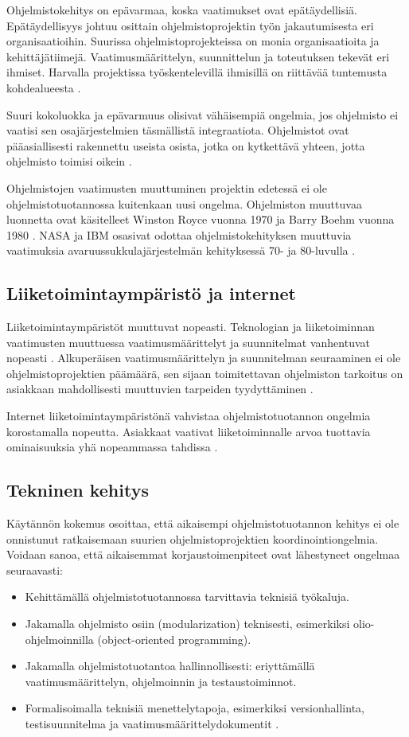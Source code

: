 \documentclass[finnish]{tktltiki2}
\theoremstyle{definition}
\theoremstyle{remark}
\begin{document}
Ohjelmistokehitys on epävarmaa, koska vaatimukset ovat epätäydellisiä. Epätäydellisyys johtuu osittain ohjelmistoprojektin työn jakautumisesta eri organisaatioihin.
Suurissa ohjelmistoprojekteissa on monia organisaatioita ja kehittäjätiimejä. Vaatimusmäärittelyn, suunnittelun ja toteutuksen tekevät eri ihmiset. Harvalla projektissa työskentelevillä ihmisillä on riittävää tuntemusta kohdealueesta \cite{KES95}.

Suuri kokoluokka ja epävarmuus olisivat vähäisempiä ongelmia, jos ohjelmisto ei vaatisi sen osajärjestelmien täsmällistä integraatiota. Ohjelmistot ovat pääasiallisesti rakennettu useista osista, jotka on kytkettävä yhteen, jotta ohjelmisto toimisi oikein \cite{KES95}.

Ohjelmistojen vaatimusten muuttuminen projektin edetessä ei ole ohjelmistotuotannossa kuitenkaan uusi ongelma. Ohjelmiston muuttuvaa luonnetta ovat käsitelleet Winston Royce vuonna 1970 \cite{ROY70} ja Barry Boehm vuonna 1980 \cite{BOE88}. NASA ja IBM osasivat odottaa ohjelmistokehityksen muuttuvia vaatimuksia avaruussukkulajärjestelmän kehityksessä 70- ja 80-luvulla \cite{MWR84}.

\subsection{Liiketoimintaympäristö ja internet}

Liiketoimintaympäristöt muuttuvat nopeasti. Teknologian ja liiketoiminnan vaatimusten muuttuessa vaatimusmäärittelyt ja suunnitelmat vanhentuvat nopeasti \cite{WIC03}. Alkuperäisen vaatimusmäärittelyn ja suunnitelman seuraaminen ei ole ohjelmistoprojektien päämäärä, sen sijaan toimitettavan ohjelmiston tarkoitus on asiakkaan mahdollisesti muuttuvien tarpeiden tyydyttäminen \cite{HIC01}.

Internet liiketoimintaympäristönä vahvistaa ohjelmistotuotannon ongelmia korostamalla nopeutta. Asiakkaat vaativat liiketoiminnalle arvoa tuottavia ominaisuuksia yhä nopeammassa tahdissa \cite{BRL03}.

\subsection{Tekninen kehitys}

Käytännön kokemus osoittaa, että aikaisempi ohjelmistotuotannon kehitys ei ole onnistunut ratkaisemaan suurien ohjelmistoprojektien koordinointiongelmia. 
Voidaan sanoa, että aikaisemmat korjaustoimenpiteet ovat lähestyneet ongelmaa seuraavasti: 
\begin{itemize}
 \item Kehittämällä ohjelmistotuotannossa tarvittavia teknisiä työkaluja.
 \item Jakamalla ohjelmisto osiin (modularization) teknisesti, esimerkiksi olio-ohjelmoinnilla (object-oriented programming). 
 \item Jakamalla ohjelmistotuotantoa hallinnollisesti: eriyttämällä vaatimusmäärittelyn, ohjelmoinnin ja testaustoiminnot.
 \item Formalisoimalla teknisiä menettelytapoja, esimerkiksi versionhallinta, testisuunnitelma ja vaatimusmäärittelydokumentit \cite{KES95}.
\end{itemize}
\end{document}

